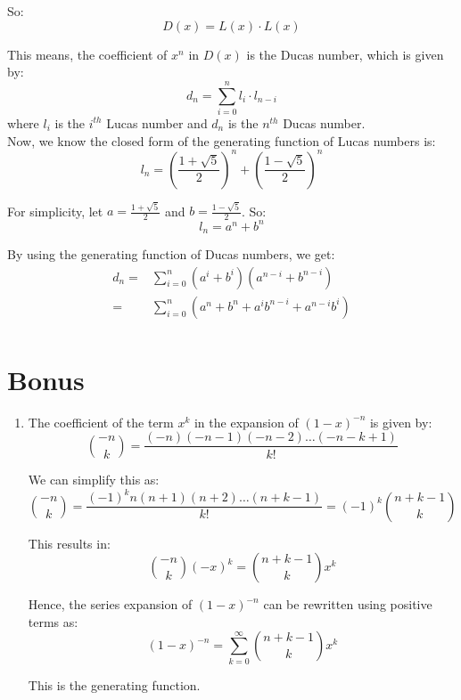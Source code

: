 \documentclass[a4paper]{article}
\begin{document}
\begin{enumerate}
        So:
        \[ D(x) = L(x) \cdot L(x) \]

        This means, the coefficient of $x^n$ in $D(x)$ is the Ducas number, which is given by: \\
        \[ d_n = \sum_{i=0}^{n} l_i \cdot l_{n-i} \]
        where $l_i$ is the $i^{th}$ Lucas number and $d_n$ is the $n^{th}$ Ducas number. \\

        Now, we know the closed form of the generating function of Lucas numbers is:
        \[ l_n = \left ( \frac{1 + \sqrt{5}}{2} \right )^n + \left ( \frac{1 - \sqrt{5}}{2} \right )^n \]

        For simplicity, let $a = \frac{1 + \sqrt{5}}{2}$ and $b = \frac{1 - \sqrt{5}}{2}$. So:
        \[ l_n = a^n + b^n \]

        By using the generating function of Ducas numbers, we get:
        \[ 
            \begin{split}
                d_n = & \sum_{i=0}^{n} (a^i + b^i)(a^{n-i} + b^{n-i}) \\
                = & \sum_{i=0}^{n} (a^{n} + b^{n} + a^ib^{n-i} + a^{n-i}b^i) \\
            \end{split}
        \]



    \end{enumerate}

\newpage
\section{Bonus}
    \begin{enumerate}
        \item The coefficient of the term $x^k$ in the expansion of $(1 - x)^{-n}$ is given by:
        \[\binom{-n}{k} = \frac{(-n)(-n-1)(-n-2) \ldots (-n-k+1)}{k!}\]

        We can simplify this as:
        \[\binom{-n}{k} = \frac{(-1)^k n(n+1)(n+2) \ldots (n+k-1)}{k!} = (-1)^k \binom{n+k-1}{k}\]

        This results in:
        \[\binom{-n}{k} (-x)^k = \binom{n+k-1}{k} x^k\]

        Hence, the series expansion of $(1 - x)^{-n}$ can be rewritten using positive terms as:
        \[(1 - x)^{-n} = \sum_{k=0}^{\infty} \binom{n+k-1}{k} x^k\]

        This is the generating function.
    \end{enumerate}
\end{document}
